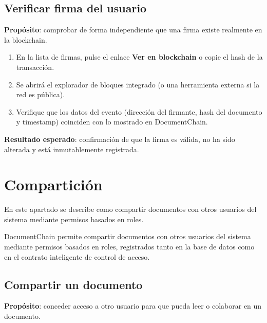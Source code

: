 \documentclass[11pt, a4paper]{article}
\begin{document}
\subsection{Verificar firma del usuario}

\textbf{Prop\'{o}sito}: comprobar de forma independiente que una firma existe realmente en la blockchain.

\begin{enumerate}
    \item En la lista de firmas, pulse el enlace \textbf{Ver en blockchain} o copie el hash de la transacci\'{o}n.
    \item Se abrir\'{a} el explorador de bloques integrado (o una herramienta externa si la red es p\'{u}blica).
    \item Verifique que los datos del evento (direcci\'{o}n del firmante, hash del documento y timestamp) coinciden con lo mostrado en DocumentChain.
\end{enumerate}

\textbf{Resultado esperado}: confirmaci\'{o}n de que la firma es v\'{a}lida, no ha sido alterada y est\'{a} inmutablemente registrada.

\section{Compartici\'{o}n}

En este apartado se describe como compartir documentos con otros usuarios del sistema mediante permisos basados en roles.

DocumentChain permite compartir documentos con otros usuarios del sistema mediante permisos basados en roles, registrados tanto en la base de datos como en el contrato inteligente de control de acceso.

\subsection{Compartir un documento}

\textbf{Prop\'{o}sito}: conceder acceso a otro usuario para que pueda leer o colaborar en un documento.
\end{document}
